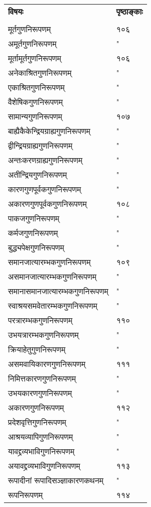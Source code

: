 \documentclass[11pt, openany]{book}
\begin{document}
\newpage
\noindent
\begin{tabular}{m{28em} m{2em}}
\textbf{विषयः} & \textbf{पृष्ठाङ्काः}\\
 &\\ 
 मूर्तगुणनिरूपणम् & १०६\\
अमूर्तगुणनिरूपणम् & "\\
मूर्तामूर्तगुणनिरूपणम् & १०६\\
अनेकाश्रितगुणनिरूपणम् & "\\
एकाश्रितगुणनिरूपणम् & "\\
वैशेषिकगुणनिरूपणम् & "\\
सामान्यगुणनिरूपणम् & १०७\\
बाह्यैकैकेन्द्रियग्राह्यगुणनिरूपणम् & "\\
द्वीन्द्रियग्राह्यगुणनिरूपणम् & "\\
अन्तःकरणग्राह्यगुणनिरूपणम् & "\\
अतीन्द्रियगुणनिरूपणम् & "\\
कारणगुणपूर्वकगुणनिरूपणम् & "\\
अकारणगुणपूर्वकगुणनिरूपणम् & १०८\\
पाकजगुणनिरूपणम् & "\\
कर्मजगुणनिरूपणम् & "\\
बुद्ध्यपेक्षगुणनिरूपणम् & "\\
समानजात्यारम्भकगुणनिरूपणम् & १०९\\
असमानजात्यारम्भकगुणनिरूपणम् & "\\
समानासमानजात्यारम्भकगुणनिरूपणम् & "\\
स्वाश्रयसमवेतारम्भकगुणनिरूपणम् & "\\
परत्रारम्भकगुणनिरूपणम् & ११०\\
उभयत्रारम्भकगुणनिरूपणम् & "\\
क्रियाहेतुगुणनिरूपणम् & "\\
असमवायिकारणगुणनिरूपणम् & १११\\
निमित्तकारणगुणनिरूपणम् & "\\
उभयकारणगुणनिरूपणम् & "\\
अकारणगुणनिरूपणम् & ११२\\
प्रदेशवृत्तिगुणनिरूपणम् & "\\
आश्रयव्यापिगुणनिरूपणम् & "\\
यावद्द्रव्यभाविगुणनिरूपणम् & "\\
अयावद्द्रव्यभाविगुणनिरूपणम् & ११३\\
रूपादीनां रूपादिसञ्ज्ञाकारणकथनम् & "\\
रूपनिरूपणम् & ११४
\end{tabular}
\end{document}

